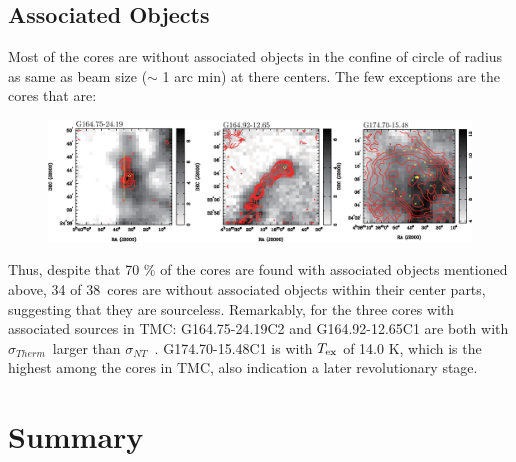 \documentclass{article}
\newcommand{\texc}{$T_{\rm {ex}}$ }
\newcommand{\sigmath}{$\sigma _{Therm}$\ }
\newcommand{\sigmant}{$\sigma _{NT}$\ }
\newcommand{\numcore}{38\ }
\begin{document}
\newpage
\subsection{Associated Objects}
Most of the cores are without associated objects in the confine of circle of radius as same as beam size ($\sim$ 1 arc min) at there centers. The few exceptions are the cores that are:
 \begin{figure}[h]
\includegraphics[totalheight=30mm]{Asso.eps}
\end{figure}

 Thus, despite that 70 \% of the cores are found with associated objects mentioned above, 34 of \numcore  cores are without associated objects within their center parts, suggesting that they are sourceless.
    Remarkably, for the three cores with associated sources in TMC: G164.75-24.19C2 and G164.92-12.65C1 are both with \sigmath larger than \sigmant . G174.70-15.48C1 is with \texc of 14.0 K, which is the highest among the cores in TMC, also indication a later revolutionary stage.

\section{Summary}
\end{document}
